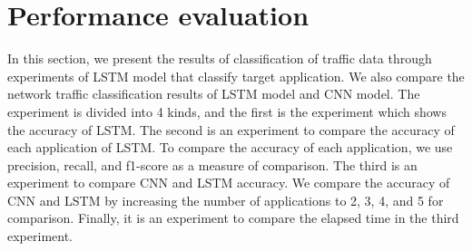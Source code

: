 \documentclass[10pt, twoside, jounal]{IEEEtran}
\begin{document}
\section{Performance evaluation}
In this section, we present the results of classification of traffic data through experiments of LSTM model that classify target application.
We also compare the network traffic classification results of LSTM model and CNN model.
The experiment is divided into 4 kinds, and the first is the experiment which shows the accuracy of LSTM.
The second is an experiment to compare the accuracy of each application of LSTM.
To compare the accuracy of each application, we use precision, recall, and f1-score as a measure of comparison.
The third is an experiment to compare CNN and LSTM accuracy.
We compare the accuracy of CNN and LSTM by increasing the number of applications to 2, 3, 4, and 5 for comparison.
Finally, it is an experiment to compare the elapsed time in the third experiment.
\end{document}
